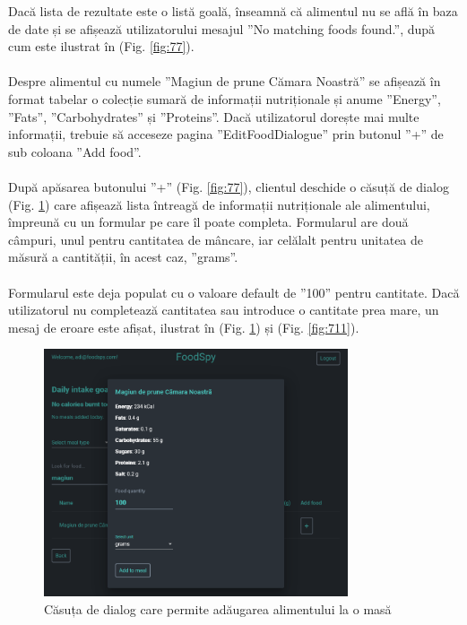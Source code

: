 Dacă lista de rezultate este o listă goală, înseamnă că alimentul nu se află în baza de date și se afișează utilizatorului mesajul ”No matching foods found.”, după cum este ilustrat în (Fig. \ref{fig:77}).
\\ \\
Despre alimentul cu numele ”Magiun de prune Cămara Noastră” se afișează în format tabelar o colecție sumară de informații nutriționale și anume ”Energy”, ”Fats”, ”Carbohydrates” și ”Proteins”. Dacă utilizatorul dorește mai multe informații, trebuie să acceseze pagina ”EditFoodDialogue” prin butonul ”+” de sub coloana ”Add food”.
\\ \\
După apăsarea butonului ”+” (Fig. \ref{fig:77}), clientul deschide o căsuță de dialog (Fig. \ref{fig:710}) care afișează lista întreagă de informații nutriționale ale alimentului, împreună cu un formular pe care îl poate completa. Formularul are două câmpuri, unul pentru cantitatea de mâncare, iar celălalt pentru unitatea de măsură a cantității, în acest caz, ”grams”.
\\ \\
Formularul este deja populat cu o valoare default de ”100” pentru cantitate. Dacă utilizatorul nu completează cantitatea sau introduce o cantitate prea mare, un mesaj de eroare este afișat, ilustrat în (Fig. \ref{fig:710}) și (Fig. \ref{fig:711}).

\begin{figure}[!htb]
	\centering
	\includegraphics[width=0.8\textwidth]
	{../LaTeX/Images/App/add_edit.PNG}
	\caption{Căsuța de dialog care permite adăugarea alimentului la o masă}
	\label{fig:710}
\end{figure}

